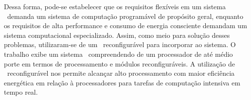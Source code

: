 		Dessa forma, pode-se estabelecer que os requisitos flexíveis em um sistema \wearable\ demanda um sistema de computação programável de propósito geral, enquanto os requisitos de alta performance e consumo de energia consciente demandam um sistema computacional especializado.
      Assim, como meio para solução desses problemas, \citeauthor{Plessl2003} utilizaram-se de um \hardware\ reconfigurável para incorporar ao sistema.
      O trabalho exibe um sistema \wearables\ compreendendo de um processador de até médio porte em termos de processamento e módulos reconfiguráveis.
		A utilização de \hardware\ reconfigurável nos permite alcançar alto processamento com maior eficiência energética em relação à processadores para tarefas de computação intensiva em tempo real.
